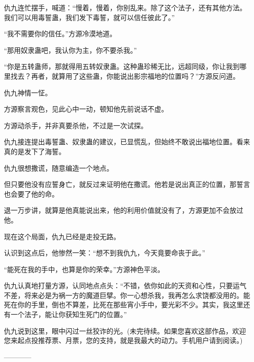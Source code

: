 \begin{this_body}
仇九连忙摆手，喊道：“慢着，慢着，你别乱来。除了这个法子，还有其他方法。我们可以用毒誓蛊，我们发下毒誓，就可以信任彼此了。”

“我不需要你的信任。”方源冷漠地道。

“那用奴隶蛊吧，我认你为主，你不要杀我。”

“你是五转蛊师，那就得用五转奴隶蛊。这种蛊珍稀无比，远超同级，你让我到哪里找去？再者，就算用了这些蛊，你能说出影宗福地的位置吗？”方源反问道。

仇九神情一怔。

方源察言观色，见此心中一动，顿知他先前说话不虚。

方源动杀手，并非真要杀他，不过是一次试探。

仇九接连提出毒誓蛊、奴隶蛊的建议，已显慌乱，但始终不敢说出福地位置。看来真的是发下了海誓。

仇九很想撒谎，随意编造一个地点。

但只要他没有应誓身亡，就反过来证明他在撒谎。他若是说出真正的位置，那誓言也会要了他的命。

退一万步讲，就算是他真能说出来，他的利用价值就没有了，方源更加不会放过他。

现在这个局面，仇九已经是走投无路。

认识到这点后，他惨然一笑：“想不到我仇九，今天竟要命丧于此。”

“能死在我的手中，也算是你的荣幸。”方源神色平淡。

仇九认真地打量方源，认同地点点头：“不错，依你如此的天资和心性，只要运气不差，将来必是为祸一方的魔道巨擘。你一心想杀我，我再怎么求饶都没用的。能死在你的手里，倒也不算差，比死在那些宵小手中，要光彩不少。其实，我这里还有一个法子，能让你获知生死门的位置。”

仇九说到这里，眼中闪过一丝狡诈的光。(未完待续。如果您喜欢这部作品，欢迎您来起点投推荐票、月票，您的支持，就是我最大的动力。手机用户请到阅读。)

------------

\end{this_body}

